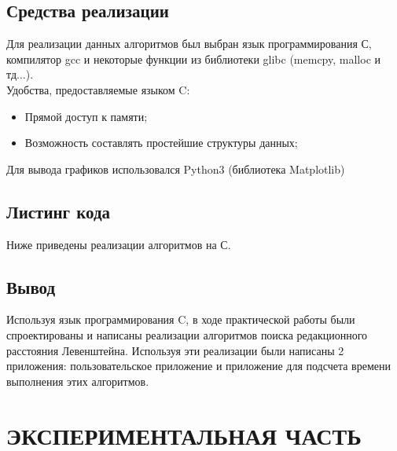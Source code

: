 \documentclass[a4paper,12pt]{article}
\begin{document}
\newpage
\subsection{Средства реализации}
Для реализации данных алгоритмов был выбран язык программирования С, компилятор
gcc и некоторые функции из библиотеки glibc (memcpy, malloc и тд...). \\
Удобства, предоставляемые языком C:
\begin{itemize}
\item Прямой доступ к памяти;
\item Возможность составлять простейшие структуры данных;
\end{itemize}
Для вывода графиков использовался Python3 (библиотека Matplotlib)

\newpage
\subsection{Листинг кода}
Ниже приведены реализации алгоритмов на С.\\


\newpage

\newpage


\newpage
\subsection{Вывод}
Используя язык программирования C, в ходе практической работы были спроектированы и написаны реализации алгоритмов поиска редакционного расстояния Левенштейна. Используя эти реализации были написаны 2 приложения: пользовательское приложение и приложение для подсчета времени выполнения этих алгоритмов.

\newpage
\section{ЭКСПЕРИМЕНТАЛЬНАЯ ЧАСТЬ}
\end{document}
